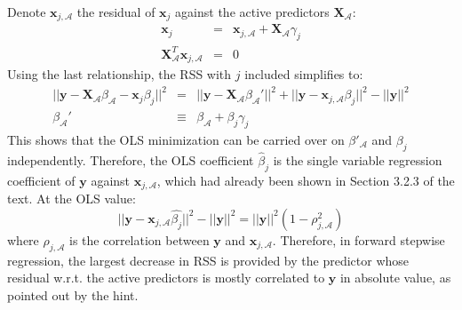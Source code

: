 

Denote $\mathbf{x}_{j, \mathcal{A}}$ the residual of $\mathbf{x}_j$
against the active predictors $\mathbf{X}_\mathcal{A}$:
\begin{eqnarray*}
    \mathbf{x}_j & = & \mathbf{x}_{j, \mathcal{A}} + \mathbf{X}_\mathcal{A} \gamma_j \\
    \mathbf{X}_\mathcal{A}^T \mathbf{x}_{j, \mathcal{A}} & = & 0
\end{eqnarray*}
Using the last relationship, the RSS with $j$ included simplifies
to:
\begin{eqnarray*}
    || \mathbf{y} - \mathbf{X}_\mathcal{A} \beta_\mathcal{A} - 
    \mathbf{x}_j \beta_j||^2 & = & || \mathbf{y} - \mathbf{X}_\mathcal{A} \beta_\mathcal{A}'||^2 + || \mathbf{y} - 
    \mathbf{x}_{j, \mathcal{A}} \beta_j||^2 - ||\mathbf{y}||^2  \\
    \beta_\mathcal{A}' & \equiv & \beta_\mathcal{A} + \beta_j \gamma_j
\end{eqnarray*}
This shows that the OLS minimization can be carried over on $\beta'_\mathcal{A}$ 
and $\beta_j$ independently. Therefore, the OLS coefficient $\hat{\beta}_j$
is the single variable regression coefficient of $\mathbf{y}$ against 
$\mathbf{x}_{j, \mathcal{A}}$, which had already been shown in Section 3.2.3
of the text. At the OLS value:
\begin{equation*}
|| \mathbf{y} - \mathbf{x}_{j, \mathcal{A}} \hat{\beta_j}||^2 - ||\mathbf{y}||^2 =
||\mathbf{y}||^2 \left(1 - \rho_{j, \mathcal{A}}^2\right)
\end{equation*}
where $\rho_{j, \mathcal{A}}$ is the correlation between $\mathbf{y}$ and
$\mathbf{x}_{j, \mathcal{A}}$. Therefore, in forward stepwise regression,
the largest decrease in RSS is provided by the predictor whose residual w.r.t. the 
active predictors is mostly correlated to $\mathbf{y}$ in absolute value,
as pointed out by the hint.

